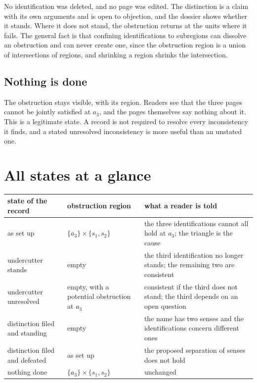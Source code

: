 \documentclass[11pt]{article}
\begin{document}
No identification was deleted, and no page was edited. The distinction is a claim with its own arguments and is open to objection, and the dossier shows whether it stands. Where it does not stand, the obstruction returns at the units where it fails. The general fact is that confining identifications to subregions can dissolve an obstruction and can never create one, since the obstruction region is a union of intersections of regions, and shrinking a region shrinks the intersection.

\subsection{Nothing is done}

The obstruction stays visible, with its region. Readers see that the three pages cannot be jointly satisfied at $a_3$, and the pages themselves say nothing about it. This is a legitimate state. A record is not required to resolve every inconsistency it finds, and a stated unresolved inconsistency is more useful than an unstated one.

\section{All states at a glance}\label{sec:glance}

\begin{center}
\small
\begin{tabularx}{\textwidth}{@{}X l X@{}}
\toprule
state of the record & obstruction region & what a reader is told\\
\midrule
as set up & $\{a_3\}\times\{s_1,s_2\}$ & the three identifications cannot all hold at $a_3$; the triangle is the cause\\
undercutter stands & empty & the third identification no longer stands; the remaining two are consistent\\
undercutter unresolved & empty, with a potential obstruction at $a_3$ & consistent if the third does not stand; the third depends on an open question\\
distinction filed and standing & empty & the name has two senses and the identifications concern different ones\\
distinction filed and defeated & as set up & the proposed separation of senses does not hold\\
nothing done & $\{a_3\}\times\{s_1,s_2\}$ & unchanged\\
\bottomrule
\end{tabularx}
\end{center}
\end{document}
